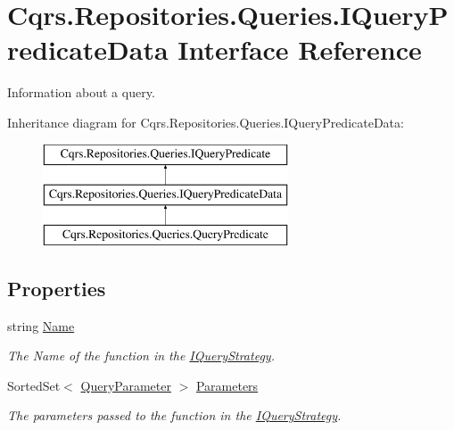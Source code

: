\hypertarget{interfaceCqrs_1_1Repositories_1_1Queries_1_1IQueryPredicateData}{}\section{Cqrs.\+Repositories.\+Queries.\+I\+Query\+Predicate\+Data Interface Reference}
\label{interfaceCqrs_1_1Repositories_1_1Queries_1_1IQueryPredicateData}


Information about a query.  


Inheritance diagram for Cqrs.\+Repositories.\+Queries.\+I\+Query\+Predicate\+Data\+:\begin{figure}[H]
\begin{center}
\leavevmode
\includegraphics[height=3.000000cm]{interfaceCqrs_1_1Repositories_1_1Queries_1_1IQueryPredicateData}
\end{center}
\end{figure}
\subsection*{Properties}
\begin{DoxyCompactItemize}
\item 
string \hyperlink{interfaceCqrs_1_1Repositories_1_1Queries_1_1IQueryPredicateData_a88461542ea0befb00874ebbb086387aa_a88461542ea0befb00874ebbb086387aa}{Name}
\begin{DoxyCompactList}\small\item\em The Name of the function in the \hyperlink{interfaceCqrs_1_1Repositories_1_1Queries_1_1IQueryStrategy}{I\+Query\+Strategy}. \end{DoxyCompactList}\item 
Sorted\+Set$<$ \hyperlink{classCqrs_1_1Repositories_1_1Queries_1_1QueryParameter}{Query\+Parameter} $>$ \hyperlink{interfaceCqrs_1_1Repositories_1_1Queries_1_1IQueryPredicateData_a7a79d734568d6ef5f9b2446bd0e99894_a7a79d734568d6ef5f9b2446bd0e99894}{Parameters}
\begin{DoxyCompactList}\small\item\em The parameters passed to the function in the \hyperlink{interfaceCqrs_1_1Repositories_1_1Queries_1_1IQueryStrategy}{I\+Query\+Strategy}. \end{DoxyCompactList}\end{DoxyCompactItemize}


